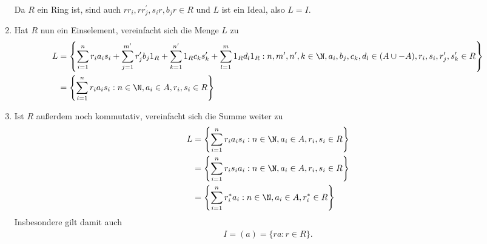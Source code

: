 \begin{solution}
\begin{enumerate}[label = (\arabic*)]
  Da $R$ ein Ring ist, sind auch $rr_i, rr_j^{\prime}, s_ir, b_jr \in R$ und $L$ ist ein Ideal, also $L = I$.
  \item Hat $R$ nun ein Einselement, vereinfacht sich die Menge $L$ zu
  \begin{align*}
  L &= \left\{\sum_{i = 1}^n r_ia_is_i + \sum_{j = 1}^{m^{\prime}}r_j^{\prime}b_j1_R +
  \sum_{k = 1}^{n^{\prime}}1_Rc_ks_k^{\prime} + \sum_{l = 1}^{m}1_Rd_l1_R :
  n,m^{\prime}, n^{\prime}, k \in \N, a_i, b_j, c_k, d_l \in (A \cup -A),
  r_i, s_i, r_j^{\prime}, s_k^{\prime} \in R \right\} \\
  &= \left\{\sum_{i = 1}^n r_ia_is_i: n \in \N, a_i \in A, r_i, s_i \in R \right\}
  \end{align*}
  \item Ist $R$ außerdem noch kommutativ, vereinfacht sich die Summe weiter zu
  \begin{align*}
    L &= \left\{\sum_{i = 1}^n r_ia_is_i: n \in \N, a_i \in A, r_i, s_i \in R \right\} \\
    &= \left\{\sum_{i = 1}^n r_is_ia_i: n \in \N, a_i \in A, r_i, s_i \in R \right\} \\
    &= \left\{\sum_{i = 1}^n r_i^*a_i: n \in \N, a_i \in A, r_i^* \in R \right\}
  \end{align*}
  Insbesondere gilt damit auch
  \begin{align*}
    I = (a) = \{ra: r \in R\}.
  \end{align*}
\end{enumerate}
\end{solution}
